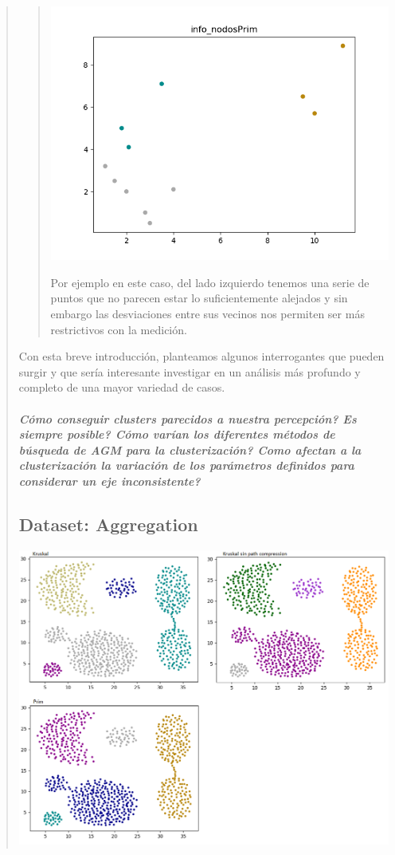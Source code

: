 \documentclass[11pt,a4paper]{article}
\begin{document}
\begin{verse}
\begin{verse}
\begin{center}
\includegraphics[scale=.8]{graficos/info_nodosPrim.png}
\end{center}
Por ejemplo en este caso, del lado izquierdo tenemos una serie de puntos que no parecen estar lo suficientemente alejados y sin embargo las desviaciones entre sus vecinos nos permiten ser más restrictivos con la medición.
\end{verse}

Con esta breve introducción, planteamos algunos interrogantes que pueden surgir y que sería interesante investigar en un análisis más profundo y completo de una mayor variedad de casos.

\subparagraph{Cómo conseguir clusters parecidos a nuestra percepción? Es siempre posible? Cómo varían los diferentes métodos de búsqueda de AGM para la clusterización? Como afectan a la clusterización la variación de los parámetros definidos para considerar un eje inconsistente?}


\subsection{Dataset: Aggregation}
\begin{center}
\includegraphics[scale=.5]{graficos/aggregation.png}
\end{center}


\end{verse}
\end{document}
